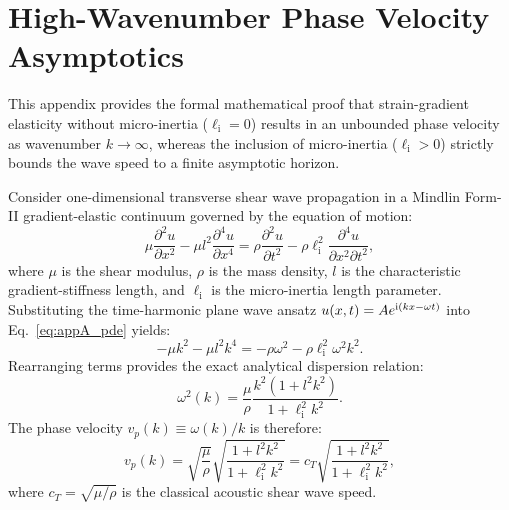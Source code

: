 \section{High-Wavenumber Phase Velocity Asymptotics}
\label{app:asymptotics}

This appendix provides the formal mathematical proof that strain-gradient elasticity without micro-inertia ($\ell_{\mathrm{i}} = 0$) results in an unbounded phase velocity as wavenumber $k \to \infty$, whereas the inclusion of micro-inertia ($\ell_{\mathrm{i}} > 0$) strictly bounds the wave speed to a finite asymptotic horizon.

Consider one-dimensional transverse shear wave propagation in a Mindlin Form-II gradient-elastic continuum governed by the equation of motion:
\begin{equation}
\mu \frac{\partial^2 u}{\partial x^2} - \mu l^2 \frac{\partial^4 u}{\partial x^4} = \rho \frac{\partial^2 u}{\partial t^2} - \rho \ell_{\mathrm{i}}^2 \frac{\partial^4 u}{\partial x^2 \partial t^2},
\label{eq:appA_pde}
\end{equation}
where $\mu$ is the shear modulus, $\rho$ is the mass density, $l$ is the characteristic gradient-stiffness length, and $\ell_{\mathrm{i}}$ is the micro-inertia length parameter. Substituting the time-harmonic plane wave ansatz $u(x, t) = A e^{\mathrm{i}(k x - \omega t)}$ into Eq.~\eqref{eq:appA_pde} yields:
\begin{equation}
-\mu k^2 - \mu l^2 k^4 = -\rho \omega^2 - \rho \ell_{\mathrm{i}}^2 \omega^2 k^2.
\label{eq:appA_char}
\end{equation}
Rearranging terms provides the exact analytical dispersion relation:
\begin{equation}
\omega^2(k) = \frac{\mu}{\rho} \frac{k^2 \left( 1 + l^2 k^2 \right)}{1 + \ell_{\mathrm{i}}^2 k^2}.
\label{eq:appA_dispersion}
\end{equation}
The phase velocity $v_p(k) \equiv \omega(k)/k$ is therefore:
\begin{equation}
v_p(k) = \sqrt{\frac{\mu}{\rho}} \sqrt{\frac{1 + l^2 k^2}{1 + \ell_{\mathrm{i}}^2 k^2}} = c_T \sqrt{\frac{1 + l^2 k^2}{1 + \ell_{\mathrm{i}}^2 k^2}},
\label{eq:appA_vp}
\end{equation}
where $c_T = \sqrt{\mu/\rho}$ is the classical acoustic shear wave speed.


